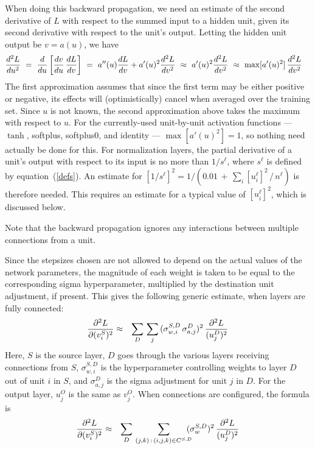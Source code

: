 \documentclass{report}[11pt]
\def\beq{\begin{eqnarray}}
\def\eeq{\end{eqnarray}}
\def\eep{\end{eqnarray}}
\begin{document}
When doing this backward propagation, we need an estimate of the
second derivative of $L$ with respect to the summed input to a
hidden unit, given its second derivative with respect to the unit's
output.  Letting the hidden unit output be $v = a(u)$, we have\beq
  {d^2L \over du^2}
   \ = \ {d \over du} \left[ {dv \over du}\, {dL \over dv} \right] 
   \ = \ a''(u) {dL \over dv} + a'(u)^2 {d^2L \over dv^2}
   \ \approx \ a'(u)^2 {d^2L \over dv^2} 
   \ \approx \ \max[a'(u)^2]\, {d^2L \over dv^2}\ \ \
\eeq%
The first approximation assumes that since the first term may be either
positive or negative, its effects will (optimistically) cancel when
averaged over the training set.  Since $u$ is not known, the second
approximation above takes the maximum with respect to $u$.  
For the currently-used unit-by-unit activation functions --- $\tanh$, softplus, 
softplus0, and identity --- $\max[a'(u)^2] = 1$, so nothing need actually
be done for this.  For normalization layers, the partial derivative of
a unit's output with respect to its input is no more than $1/s^{\ell}$,
where $s^{\ell}$ is defined by equation~(\ref{defs}). An estimate for
$[1/s^{\ell}]^2 = 1/(0.01\,+\,\sum\nolimits_i [u^{\ell}_i]^2\,/\,n^{\ell})$
is therefore needed.  This requires an estimate for a typical value of
$[u^{\ell}_i]^2$, which is discussed below.

Note that the backward propagation ignores any interactions between
multiple connections from a unit.

Since the stepsizes chosen are not allowed to depend on the actual
values of the network parameters, the magnitude of each weight is
taken to be equal to the corresponding sigma hyperparameter,
multiplied by the destination unit adjustment, if present.  This gives
the following generic estimate, when layers are fully connected:\beq
  {\partial^2 L \over \partial (v^S_i)^2} & \approx &
     \sum_D\, \sum_j\, (\sigma^{S,D}_{w,i}\, \sigma^D_{a,j})^2\, 
     {\partial^2 L \over (u^D_j)^2}
\eeq%
Here, $S$ is the source layer, $D$ goes through the various layers
receiving connections from $S$, $\sigma^{S,D}_{w,i}$ is the
hyperparameter controlling weights to layer $D$ out of unit $i$ in
$S$, and $\sigma^D_{a,j}$ is the sigma adjustment for unit $j$ in $D$.
For the output layer, $u^O_j$ is the same as $v^O_j$.
When connections are configured, the formula is
\beq
  {\partial^2 L \over \partial (v^S_i)^2} & \approx &
     \sum_D\, \sum_{(j,k)\,:\,(i,j,k)\in C^{S,D}}\!\!\!\!
       (\sigma^{S,D}_w)^2\, {\partial^2 L \over (u^D_j)^2}
\eep
     
\end{document}
